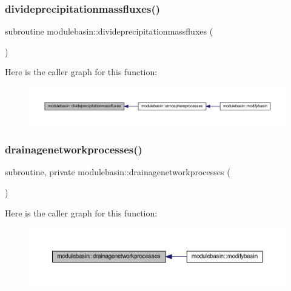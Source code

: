 \subsubsection{\texorpdfstring{divideprecipitationmassfluxes()}{divideprecipitationmassfluxes()}}
{\footnotesize\ttfamily subroutine modulebasin\+::divideprecipitationmassfluxes (\begin{DoxyParamCaption}{ }\end{DoxyParamCaption})\hspace{0.3cm}{\ttfamily [private]}}

Here is the caller graph for this function\+:\nopagebreak
\begin{figure}[H]
\begin{center}
\leavevmode
\includegraphics[width=350pt]{namespacemodulebasin_a9ece838b83c6e7f083c271a95dbb460f_icgraph}
\end{center}
\end{figure}
\mbox{\label{namespacemodulebasin_ab83592a7be03719e664d5eb440853228}} 
\subsubsection{\texorpdfstring{drainagenetworkprocesses()}{drainagenetworkprocesses()}}
{\footnotesize\ttfamily subroutine, private modulebasin\+::drainagenetworkprocesses (\begin{DoxyParamCaption}{ }\end{DoxyParamCaption})\hspace{0.3cm}{\ttfamily [private]}}

Here is the caller graph for this function\+:\nopagebreak
\begin{figure}[H]
\begin{center}
\leavevmode
\includegraphics[width=350pt]{namespacemodulebasin_ab83592a7be03719e664d5eb440853228_icgraph}
\end{center}
\end{figure}
\mbox{\label{namespacemodulebasin_ac386c2a8b57550077a00db68e3c300ab}} 
